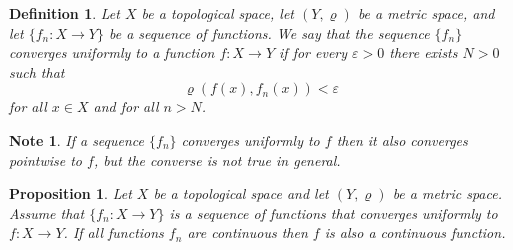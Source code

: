 \documentclass[11pt, letterpaper, oneside]{report}
\theoremstyle{pplain}
\newtheorem{proposition}[theorem]{Proposition}
\newtheorem{ITERMVALUE THM}[theorem]{Intermediate Value Theorem}
\newtheorem{HEINEBOREL THM}[theorem]{Heine-Borel Theorem}
\newtheorem{UMETR THM}[theorem]{Urysohn Metrization Theorem}
\newtheorem{UMETR2 THM}[theorem]{Urysohn Metrization Theorem (v.2)}
\theoremstyle{ddefinition}
\newtheorem{definition}[theorem]{Definition}
\newtheorem{note}[theorem]{Note}
\theoremstyle{nnn}
\newtheorem{TDA NN}[theorem]{Topological Data Analysis. }
\theoremstyle{eexercise}
\begin{document}
 
\begin{definition}
Let $X$ be a topological space,  let $(Y, \varrho)$ be a metric space, and
let $\{f_{n}\colon X\to Y\}$ be a sequence of functions. We say that the sequence 
$\{f_{n}\}$ \emph{converges uniformly} to a function $f\colon X\to Y$ if for every $\varepsilon>0$
there exists $N>0$ such that 
$$\varrho(f(x), f_{n}(x)) < \varepsilon$$
for all $x\in X$ and for all $n> N$. 
\end{definition}

\begin{note}
If a sequence $\{f_{n}\}$ converges uniformly to $f$ then it also converges pointwise to $f$, 
but the converse is not true in general. 
\end{note}

\begin{proposition}
\label{UNIFORM CONV PROP}
Let $X$ be a topological space and let $(Y, \varrho)$ be a metric space. Assume that 
$\{f_{n}\colon X\to Y\}$ is a sequence of functions that converges uniformly to 
$f\colon X\to Y$. If all functions $f_{n}$ are continuous then $f$ is also a continuous 
function. 
\end{proposition}
\end{document}
